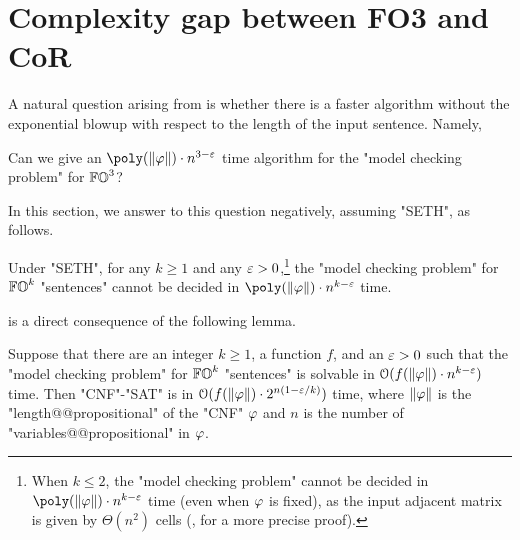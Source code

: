 \section{Complexity gap between FO3 and CoR}\label{sec: from cnf}
A natural question arising from  is whether there is a faster algorithm without the exponential blowup with respect to the length of the input sentence.
Namely,
\begin{center}
    Can we give an $\poly(\len{\fml}) \cdot n^{3 - \eps}$ time algorithm for the "model checking problem" for $\mathbb{FO}^{3}$?
\end{center}
In this section, we answer to this question negatively, assuming "SETH", as follows.
\begin{theorem}\label{theorem: FO3 model checking hardness}
    Under "SETH",
    for any $k \ge 1$ and any $\varepsilon > 0$,\footnote{When $k \le 2$,
    the "model checking problem" cannot be decided in $\poly(\len{\fml}) \cdot n^{k - \eps}$ time (even when $\fml$ is fixed), as the input adjacent matrix is given by $\Theta(n^2)$ cells (, for a more precise proof).}
    the "model checking problem" for $\mathbb{FO}^{k}$ "sentences" cannot be decided in $\poly(\len{\fml}) \cdot n^{k - \eps}$ time.
\end{theorem}
 is a direct consequence of the following lemma.
\begin{lemma}\label{lemma: FO3 model checking hardness}
    Suppose that there are an integer $k \ge 1$, a function $f$, and an $\varepsilon > 0$ such that
    the "model checking problem" for $\mathbb{FO}^{k}$ "sentences" is solvable in $\mathcal{O}(f(\len{\fml}) \cdot n^{k - \eps})$ time.
    Then "CNF"-"SAT" is in $\mathcal{O}(f(\len{\fml}) \cdot 2^{n (1 - \eps/k)})$ time,
    where $\len{\fml}$ is the "length@@propositional" of the "CNF" $\fml$ and $n$ is the number of "variables@@propositional" in $\fml$.
\end{lemma}
